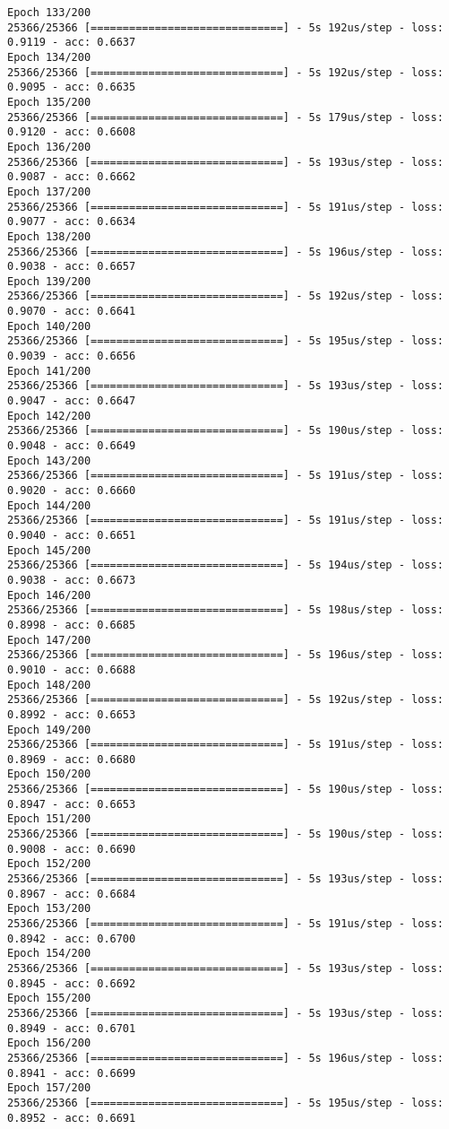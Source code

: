 \documentclass[11pt]{article}
\begin{document}
\begin{Verbatim}[commandchars=\\\{\}]
Epoch 133/200
25366/25366 [==============================] - 5s 192us/step - loss: 0.9119 - acc: 0.6637
Epoch 134/200
25366/25366 [==============================] - 5s 192us/step - loss: 0.9095 - acc: 0.6635
Epoch 135/200
25366/25366 [==============================] - 5s 179us/step - loss: 0.9120 - acc: 0.6608
Epoch 136/200
25366/25366 [==============================] - 5s 193us/step - loss: 0.9087 - acc: 0.6662
Epoch 137/200
25366/25366 [==============================] - 5s 191us/step - loss: 0.9077 - acc: 0.6634
Epoch 138/200
25366/25366 [==============================] - 5s 196us/step - loss: 0.9038 - acc: 0.6657
Epoch 139/200
25366/25366 [==============================] - 5s 192us/step - loss: 0.9070 - acc: 0.6641
Epoch 140/200
25366/25366 [==============================] - 5s 195us/step - loss: 0.9039 - acc: 0.6656
Epoch 141/200
25366/25366 [==============================] - 5s 193us/step - loss: 0.9047 - acc: 0.6647
Epoch 142/200
25366/25366 [==============================] - 5s 190us/step - loss: 0.9048 - acc: 0.6649
Epoch 143/200
25366/25366 [==============================] - 5s 191us/step - loss: 0.9020 - acc: 0.6660
Epoch 144/200
25366/25366 [==============================] - 5s 191us/step - loss: 0.9040 - acc: 0.6651
Epoch 145/200
25366/25366 [==============================] - 5s 194us/step - loss: 0.9038 - acc: 0.6673
Epoch 146/200
25366/25366 [==============================] - 5s 198us/step - loss: 0.8998 - acc: 0.6685
Epoch 147/200
25366/25366 [==============================] - 5s 196us/step - loss: 0.9010 - acc: 0.6688
Epoch 148/200
25366/25366 [==============================] - 5s 192us/step - loss: 0.8992 - acc: 0.6653
Epoch 149/200
25366/25366 [==============================] - 5s 191us/step - loss: 0.8969 - acc: 0.6680
Epoch 150/200
25366/25366 [==============================] - 5s 190us/step - loss: 0.8947 - acc: 0.6653
Epoch 151/200
25366/25366 [==============================] - 5s 190us/step - loss: 0.9008 - acc: 0.6690
Epoch 152/200
25366/25366 [==============================] - 5s 193us/step - loss: 0.8967 - acc: 0.6684
Epoch 153/200
25366/25366 [==============================] - 5s 191us/step - loss: 0.8942 - acc: 0.6700
Epoch 154/200
25366/25366 [==============================] - 5s 193us/step - loss: 0.8945 - acc: 0.6692
Epoch 155/200
25366/25366 [==============================] - 5s 193us/step - loss: 0.8949 - acc: 0.6701
Epoch 156/200
25366/25366 [==============================] - 5s 196us/step - loss: 0.8941 - acc: 0.6699
Epoch 157/200
25366/25366 [==============================] - 5s 195us/step - loss: 0.8952 - acc: 0.6691

\end{Verbatim}
\end{document}
